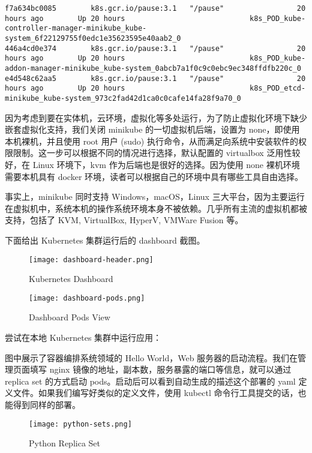 \begin{lstlisting}
f7a634bc0085        k8s.gcr.io/pause:3.1   "/pause"                 20 hours ago        Up 20 hours                             k8s_POD_kube-controller-manager-minikube_kube-system_6f22129755f0edc1e35623595e40aab2_0
446a4cd0e374        k8s.gcr.io/pause:3.1   "/pause"                 20 hours ago        Up 20 hours                             k8s_POD_kube-addon-manager-minikube_kube-system_0abcb7a1f0c9c0ebc9ec348ffdfb220c_0
e4d548c62aa5        k8s.gcr.io/pause:3.1   "/pause"                 20 hours ago        Up 20 hours                             k8s_POD_etcd-minikube_kube-system_973c2fad42d1ca0c0cafe14fa28f9a70_0
\end{lstlisting}

因为考虑到要在实体机，云环境，虚拟化等多处运行，为了防止虚拟化环境下缺少嵌套虚拟化支持，我们关闭 minikube 的一切虚拟机后端，设置为 none，即使用本机裸机，并且使用 root 用户 (sudo) 执行命令，从而满足向系统中安装软件的权限限制。这一步可以根据不同的情况进行选择，默认配置的 virtualbox 泛用性较好，在 Linux 环境下，kvm 作为后端也是很好的选择。因为使用 none 裸机环境需要本机具有 docker 环境，读者可以根据自己的环境中具有哪些工具自由选择。

事实上，minikube 同时支持 Windows，macOS，Linux 三大平台，因为主要运行在虚拟机中，系统本机的操作系统环境本身不被依赖。几乎所有主流的虚拟机都被支持，包括了 KVM, VirtualBox, HyperV, VMWare Fusion 等。

下面给出 Kubernetes 集群运行后的 dashboard 截图。

\begin{figure}
    \texttt{[image: dashboard-header.png]}
    \caption{Kubernetes Dashboard}
\end{figure}

\begin{figure}
    \texttt{[image: dashboard-pods.png]}
    \caption{Dashboard Pods View}
\end{figure}

尝试在本地 Kubernetes 集群中运行应用：

图中展示了容器编排系统领域的 Hello World，Web 服务器的启动流程。我们在管理页面填写 nginx 镜像的地址，副本数，服务暴露的端口等信息，就可以通过 replica set 的方式启动 pods。启动后可以看到自动生成的描述这个部署的 yaml 定义文件。如果我们编写好类似的定义文件，使用 kubectl 命令行工具提交的话，也能得到同样的部署。

\begin{figure}
    \texttt{[image: python-sets.png]}
    \caption{Python Replica Set}
\end{figure}

